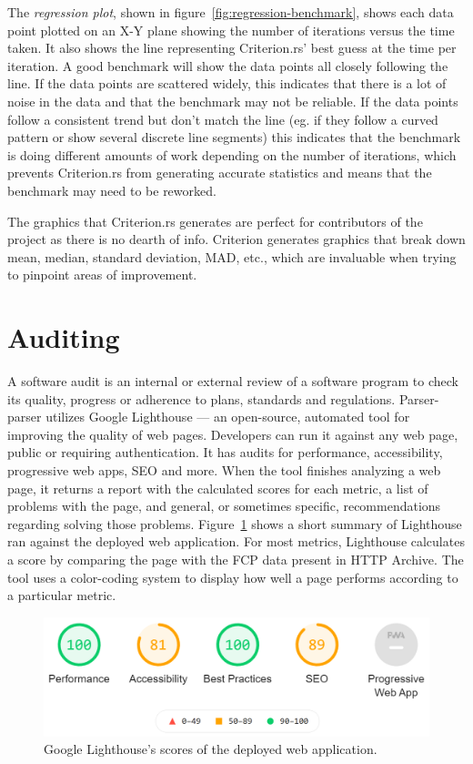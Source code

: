 \documentclass[english,engineering]{wizthesis}
\newcommand{\thisproject}{Parser-parser}
\begin{document}
The \emph{regression plot}, shown in figure~\ref{fig:regression-benchmark},
shows each data point plotted on an X-Y plane showing the number of iterations
versus the time taken. It also shows the line representing Criterion.rs' best
guess at the time per iteration. A good benchmark will show the data points all
closely following the line. If the data points are scattered widely, this
indicates that there is a lot of noise in the data and that the benchmark may
not be reliable. If the data points follow a consistent trend but don't match
the line (eg. if they follow a curved pattern or show several discrete line
segments) this indicates that the benchmark is doing different amounts of work
depending on the number of iterations, which prevents Criterion.rs from
generating accurate statistics and means that the benchmark may need to be
reworked.

The graphics that Criterion.rs generates are perfect for contributors of the
project as there is no dearth of info. Criterion generates graphics that break
down mean, median, standard deviation, MAD, etc., which are invaluable when
trying to pinpoint areas of improvement.

\section{Auditing}

A software audit is an internal or external review of a software program to
check its quality, progress or adherence to plans, standards and regulations.
\thisproject{} utilizes Google Lighthouse --- an open-source, automated tool for
improving the quality of web pages. Developers can run it against any web page,
public or requiring authentication. It has audits for performance,
accessibility, progressive web apps, SEO and more. When the tool finishes
analyzing a web page, it returns a report with the calculated scores for each
metric, a list of problems with the page, and general, or sometimes specific,
recommendations regarding solving those problems.
Figure~\ref{fig:lighthouse-summary} shows a short summary of Lighthouse ran
against the deployed web application. For most metrics, Lighthouse calculates a
score by comparing the page with the FCP data present in HTTP Archive. The tool
uses a color-coding system to display how well a page performs according to a
particular metric.

\begin{figure}[h]
  \centering
  \includegraphics[width=\textwidth]{lighthouse_summary.png}
  \caption{Google Lighthouse's scores of the deployed web application.}
  \label{fig:lighthouse-summary}
\end{figure}
\end{document}
